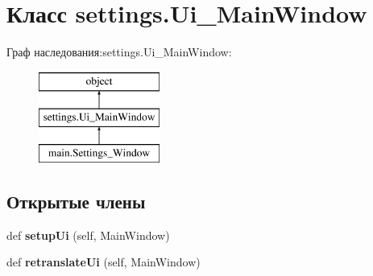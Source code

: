 \hypertarget{classsettings_1_1_ui___main_window}{}\section{Класс settings.\+Ui\+\_\+\+Main\+Window}
\label{classsettings_1_1_ui___main_window}
Граф наследования\+:settings.\+Ui\+\_\+\+Main\+Window\+:\begin{figure}[H]
\begin{center}
\leavevmode
\includegraphics[height=3.000000cm]{classsettings_1_1_ui___main_window}
\end{center}
\end{figure}
\subsection*{Открытые члены}
\begin{DoxyCompactItemize}
\item 
\mbox{\label{classsettings_1_1_ui___main_window_ac78f33ac49b8b6752bed08ef8530d3f9}} 
def {\bfseries setup\+Ui} (self, Main\+Window)
\item 
\mbox{\label{classsettings_1_1_ui___main_window_abb116449c6b84a0021a2b66e6c4a6844}} 
def {\bfseries retranslate\+Ui} (self, Main\+Window)
\end{DoxyCompactItemize}
